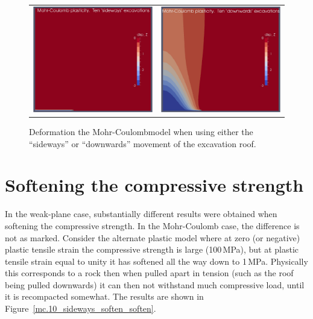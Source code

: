\documentclass[]{scrreprt}
\begin{document}
\begin{figure}[htb]
\begin{center}
\begin{tabular}{cc}
\includegraphics[width=6cm]{mc_only_10_sideways_disp.pdf} &
\includegraphics[width=6cm]{mc_only_10_downwards_disp.pdf}
\end{tabular}
\caption{Deformation the Mohr-Coulombmodel when using either the
  ``sideways'' or ``downwards'' movement of the excavation roof.}
\label{mc.10_step}
\end{center}
\end{figure}

\section{Softening the compressive strength}

In the weak-plane case, substantially different results were obtained
when softening the compressive strength.  In the Mohr-Coulomb case,
the difference is not as marked.  Consider the alternate plastic model
where at zero (or negative) plastic tensile strain the compressive strength
is large (100\,MPa), but at plastic tensile strain equal to unity it
has softened all the way down to 1\,MPa.  Physically this corresponds
to a rock then when pulled apart in tension (such as the roof being
pulled downwards) it can then not withstand much compressive load,
until it is recompacted somewhat.  The results are shown in Figure~\ref{mc.10_sideways_soften_soften}.
\end{document}

